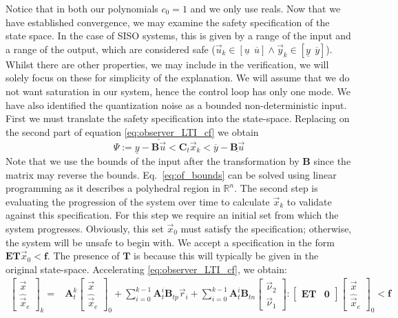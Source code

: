 \documentclass[runningheads,a4paper]{llncs}
\newcommand{\mat}[1]{\boldsymbol{#1}}
\begin{document}
Notice that in both our polynomials $c_0=1$ and we only use reals.
Now that we have established convergence, we may examine the safety 
specification of the state space. In the case of SISO systems, 
this is given by a range of the input and a range of the output, 
which are considered safe ($\vec{u}_k \in [\underline{u}\ \ \overline{u}] \wedge \vec{y}_k \in [\underline{y}\ \ \overline{y}]$). 
Whilst there are other properties, we may include in the verification, 
we will solely focus on these for simplicity of the explanation.
We will assume that we do not want saturation in our system, 
hence the control loop has only one mode. We have also identified 
the quantization noise as a bounded non-deterministic input.
First we must translate the safety specification into the state-space. 
Replacing on the second part of equation \eqref{eq:observer_LTI_cf} we obtain
%
\begin{equation}
\Psi := \underline{y}-\overline{\mat{B}\vec{u}}<\mat{C}_t\vec{x}_k<\overline{y}-\underline{\mat{B}\vec{u}}
\label{eq:of_bounds}
\end{equation}
Note that we use the bounds of the input after the transformation by $\mat{B}$ 
since the matrix may reverse the bounds. Eq.~\eqref{eq:of_bounds} can be solved 
using linear programming as it describes a polyhedral region in $\mathbb{R}^n$.
The second step is evaluating the progression of the system over time to calculate 
$\vec{x}_k$ to validate against this specification. For this step we require 
an initial set from which the system progresses. Obviously, this set $\vec{x}_0$ 
must satisfy the specification; otherwise, the system will be unsafe to begin with.
We accept a specification in the form $\mat{E}\mat{T}\vec{x}_0<\mat{f}$. 
The presence of $\mat{T}$ is because this will typically be given in the original 
state-space. Accelerating \eqref{eq:observer_LTI_cf}, we obtain:
%
\begin{align}
\label{eq:acc_observer_LTI_cf}
\left [\begin{array}{c}\vec{x}\\ \hat{\vec{x}}_e \end{array}\right]_k
=&\mat{A}_t^k
\left [\begin{array}{c}\vec{x}\\ \hat{\vec{x}}_e \end{array}\right]_0
+\sum_{i=0}^{k-1} \mat{A}_t^i \mat{B}_{tp} \vec{r}_i
+\sum_{i=0}^{k-1} \mat{A}_t^i \mat{B}_{tn}\left [\begin{array}{c}\vec{\nu}_2\\ \vec{\nu}_1\end{array}\right] :
 \left [\begin{array}{cc}\mat{E}\mat{T}&\mat{0}\end{array}\right] \left [\begin{array}{c}\vec{x}\\ \hat{\vec{x}}_e \end{array}\right]_0<\mat{f}
\end{align}
\end{document}
